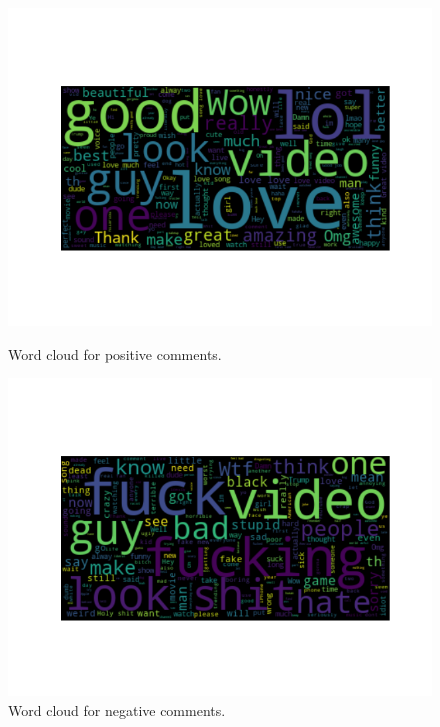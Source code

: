 \begin{figure}[h]
\centering
\begin{minipage}{0.49\textwidth}
\centering
\includegraphics[width=1.0\linewidth]{figures/pos_WordCloud.png}
\caption{Word cloud for positive comments.}
\label{fig:poscloud}
\end{minipage}
\begin{minipage}{0.49\textwidth}
\centering
\includegraphics[width=1.0\linewidth]{figures/neg_WordCloud.png}
\caption{Word cloud for negative comments.}
\label{fig:negcloud}
\end{minipage}
\end{figure}

